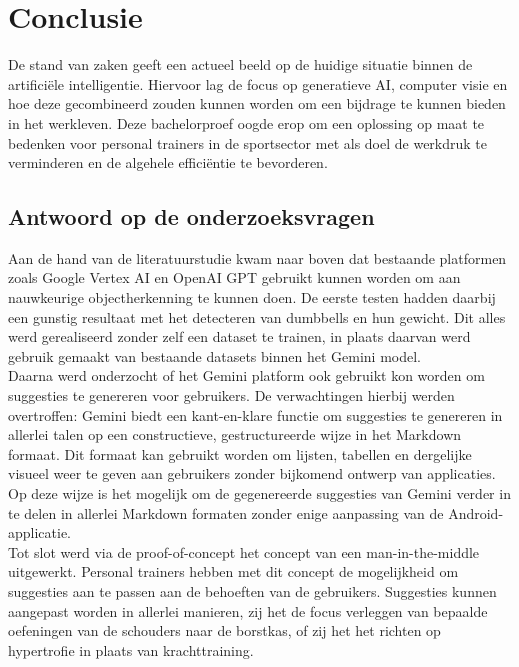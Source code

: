 
\chapter{Conclusie}
\label{ch:conclusie}
De stand van zaken geeft een actueel beeld op de huidige situatie binnen de artificiële intelligentie.
Hiervoor lag de focus op generatieve AI, computer visie en hoe deze gecombineerd zouden kunnen worden om een bijdrage te kunnen bieden in het werkleven.
Deze bachelorproef oogde erop om een oplossing op maat te bedenken voor personal trainers in de sportsector met als doel de werkdruk te verminderen en de algehele efficiëntie te bevorderen.

\section{Antwoord op de onderzoeksvragen}
\label{sec:antwoord-op-de-onderzoeksvragen}
Aan de hand van de literatuurstudie kwam naar boven dat bestaande platformen zoals Google Vertex AI en OpenAI GPT gebruikt kunnen worden om aan nauwkeurige objectherkenning te kunnen doen.
De eerste testen hadden daarbij een gunstig resultaat met het detecteren van dumbbells en hun gewicht.
Dit alles werd gerealiseerd zonder zelf een dataset te trainen, in plaats daarvan werd gebruik gemaakt van bestaande datasets binnen het Gemini model.\\

Daarna werd onderzocht of het Gemini platform ook gebruikt kon worden om suggesties te genereren voor gebruikers.
De verwachtingen hierbij werden overtroffen: Gemini biedt een kant-en-klare functie om suggesties te genereren in allerlei talen op een constructieve, gestructureerde wijze in het Markdown formaat.
Dit formaat kan gebruikt worden om lijsten, tabellen en dergelijke visueel weer te geven aan gebruikers zonder bijkomend ontwerp van applicaties.
Op deze wijze is het mogelijk om de gegenereerde suggesties van Gemini verder in te delen in allerlei Markdown formaten zonder enige aanpassing van de Android-applicatie.\\

Tot slot werd via de proof-of-concept het concept van een man-in-the-middle uitgewerkt.
Personal trainers hebben met dit concept de mogelijkheid om suggesties aan te passen aan de behoeften van de gebruikers.
Suggesties kunnen aangepast worden in allerlei manieren, zij het de focus verleggen van bepaalde oefeningen van de schouders naar de borstkas, of zij het het richten op hypertrofie in plaats van krachttraining.\\

